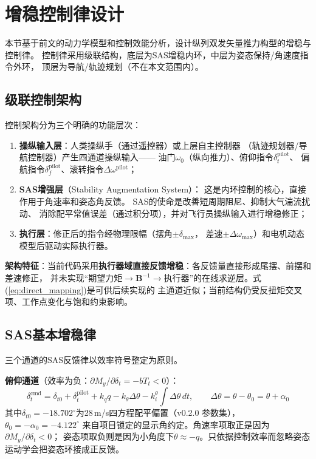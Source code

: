 \section{增稳控制律设计}
\label{sec:control}

本节基于前文的动力学模型和控制效能分析，设计纵列双发矢量推力构型的增稳与控制律。
控制律采用级联结构，底层为SAS增稳内环，中层为姿态保持/角速度指令外环，
顶层为导航/轨迹规划（不在本文范围内）。

\subsection{级联控制架构}

控制架构分为三个明确的功能层次：

\begin{enumerate}[label=(\arabic*)]
    \item \textbf{操纵输入层}：人类操纵手（通过遥控器）或上层自主控制器
          （轨迹规划器/导航控制器）产生四通道操纵输入——
          油门$\omega_0$（纵向推力）、俯仰指令$\delta_t^{\text{pilot}}$、
          偏航指令$\delta_f^{\text{pilot}}$、滚转指令$\Delta\omega^{\text{pilot}}$；
    \item \textbf{SAS增强层}（Stability Augmentation System）：
          这是内环控制的核心，直接作用于角速率和姿态角反馈。
          SAS的使命是改善短周期阻尼、抑制大气湍流扰动、
          消除配平常值误差（通过积分项），并对飞行员操纵输入进行增稳修正；
    \item \textbf{执行层}：修正后的指令经物理限幅（摆角$\pm\delta_{\max}$，
          差速$\pm\Delta\omega_{\max}$）和电机动态模型后驱动实际执行器。
\end{enumerate}

\textbf{架构特征}：当前代码采用\textbf{执行器域直接反馈增稳}：各反馈量直接形成尾摆、前摆和差速修正，
并未实现“期望力矩$\to\bm{B}^{-1}\to$执行器”的在线求逆层。式(\ref{eq:direct_mapping})是可供后续实现的
主通道近似；当前结构仍受反扭矩交叉项、工作点变化与饱和约束影响。



\subsection{SAS基本增稳律}

三个通道的SAS反馈律以效率符号整定为原则。

\textbf{俯仰通道}（效率为负：$\partial M_y / \partial \delta_t = -b T_t < 0$）：
\begin{equation}
    \delta_t^{\text{cmd}} = \delta_{t0}+\delta_t^{\text{pilot}}
    + k_q q - k_\theta \Delta\theta
    - k_i^\theta \int \Delta\theta \, dt,\qquad
    \Delta\theta=\theta-\theta_0=\theta+\alpha_0
    \label{eq:sas_pitch}
\end{equation}
其中$\delta_{t0}=-18.702^\circ$为28\,m/s四方程配平偏置（v0.2.0 参数集），$\theta_0=-\alpha_0=-4.122^\circ$
来自项目锁定的显示角约定。角速率项取正是因为$\partial M_y/\partial\delta_t<0$；
姿态项取负则是因为小角度下$\dot\theta\approx-q$。只依据控制效率而忽略姿态运动学会把姿态环接成正反馈。

